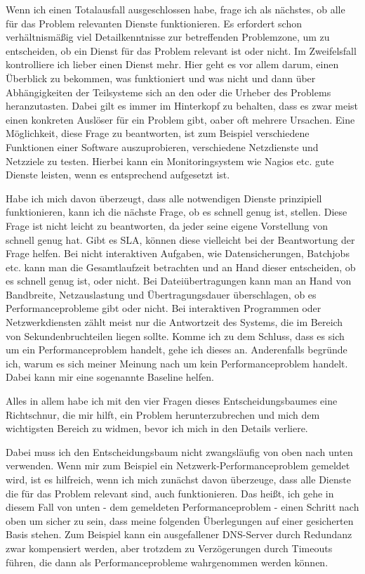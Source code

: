 \begin{normaltext}
  Wenn ich einen Totalausfall ausgeschlossen habe, frage ich als nächstes, ob
  alle für das Problem relevanten Dienste funktionieren. Es erfordert schon
  verhältnismäßig viel Detailkenntnisse zur betreffenden Problemzone, um zu
  entscheiden, ob ein Dienst für das Problem relevant ist oder nicht. Im
  Zweifelsfall kontrolliere ich lieber einen Dienst mehr. Hier geht es vor
  allem darum, einen Überblick zu bekommen, was funktioniert und was nicht und
  dann über Abhängigkeiten der Teilsysteme sich an den oder die Urheber des
  Problems heranzutasten. Dabei gilt es immer im Hinterkopf zu behalten, dass
  es zwar meist einen konkreten Auslöser für ein Problem gibt, oaber oft
  mehrere Ursachen. Eine Möglichkeit, diese Frage zu beantworten, ist zum
  Beispiel verschiedene Funktionen einer Software auszuprobieren, verschiedene
  Netzdienste und Netzziele zu testen. Hierbei kann ein Monitoringsystem wie
  Nagios etc. gute Dienste leisten, wenn es entsprechend aufgesetzt ist.

  Habe ich mich davon überzeugt, dass alle notwendigen Dienste prinzipiell
  funktionieren, kann ich die nächste Frage, ob es schnell genug ist, stellen.
  Diese Frage ist nicht leicht zu beantworten, da jeder seine eigene
  Vorstellung von schnell genug hat. Gibt es SLA, können diese vielleicht bei
  der Beantwortung der Frage helfen. Bei nicht interaktiven Aufgaben, wie
  Datensicherungen, Batchjobs etc. kann man die Gesamtlaufzeit betrachten und
  an Hand dieser entscheiden, ob es schnell genug ist, oder nicht. Bei
  Dateiübertragungen kann man an Hand von Bandbreite, Netzauslastung und
  Übertragungsdauer überschlagen, ob es Performanceprobleme gibt oder nicht.
  Bei interaktiven Programmen oder Netzwerkdiensten zählt meist nur die
  Antwortzeit des Systems, die im Bereich von Sekundenbruchteilen liegen
  sollte. Komme ich zu dem Schluss, dass es sich um ein Performanceproblem
  handelt, gehe ich dieses an. Anderenfalls begründe ich, warum es sich meiner
  Meinung nach um kein Performanceproblem handelt. Dabei kann mir eine
  sogenannte Baseline helfen.

  Alles in allem habe ich mit den vier Fragen dieses Entscheidungsbaumes eine
  Richtschnur, die mir hilft, ein Problem herunterzubrechen und mich dem
  wichtigsten Bereich zu widmen, bevor ich mich in den Details verliere.

  Dabei muss ich den Entscheidungsbaum nicht zwangsläufig von oben nach unten
  verwenden. Wenn mir zum Beispiel ein Netzwerk-Performanceproblem gemeldet
  wird, ist es hilfreich, wenn ich mich zunächst davon überzeuge, dass alle
  Dienste die für das Problem relevant sind, auch funktionieren. Das heißt,
  ich gehe in diesem Fall von unten - dem gemeldeten Performanceproblem -
  einen Schritt nach oben um sicher zu sein, dass meine folgenden Überlegungen
  auf einer gesicherten Basis stehen. Zum Beispiel kann ein ausgefallener
  DNS-Server durch Redundanz zwar kompensiert werden, aber trotzdem zu
  Verzögerungen durch Timeouts führen, die dann als Performanceprobleme
  wahrgenommen werden können.
\end{normaltext}


